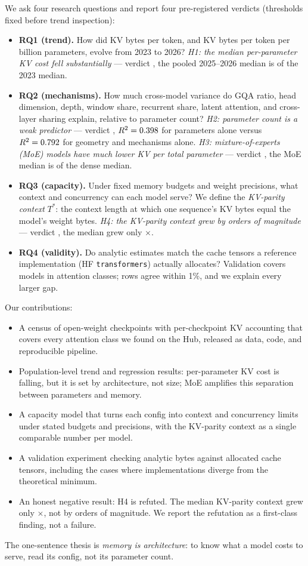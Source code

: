 We ask four research questions and report four pre-registered verdicts
(thresholds fixed before trend inspection):
\begin{itemize}
  \item \textbf{RQ1 (trend).} How did KV bytes per token, and KV bytes per token
  per billion parameters, evolve from 2023 to 2026? \emph{H1: the median
  per-parameter KV cost fell substantially} --- verdict \kvcHOneVerdict{}, the
  pooled 2025--2026 median is \kvcHOneRatio{} of the 2023 median.
  \item \textbf{RQ2 (mechanisms).} How much cross-model variance do GQA ratio,
  head dimension, depth, window share, recurrent share, latent attention, and
  cross-layer sharing explain, relative to parameter count? \emph{H2: parameter
  count is a weak predictor} --- verdict \kvcHTwoVerdict{}, $R^2=0.398$
  for parameters alone versus $R^2=0.792$ for geometry and mechanisms
  alone. \emph{H3: mixture-of-experts (MoE) models have much lower KV per total
  parameter} --- verdict \kvcHThreeVerdict{}, the MoE median is
  \kvcHThreeRatio{} of the dense median.
  \item \textbf{RQ3 (capacity).} Under fixed memory budgets and weight
  precisions, what context and concurrency can each model serve? We define the
  \emph{KV-parity context} $T^{*}$: the context length at which one sequence's
  KV bytes equal the model's weight bytes.
  \emph{H4: the KV-parity context grew by orders of magnitude} --- verdict
  \kvcHFourVerdict{}, the median grew only \kvcHFourRatio$\times$.
  \item \textbf{RQ4 (validity).} Do analytic estimates match the cache tensors
  a reference implementation (HF \texttt{transformers}) actually allocates?
  Validation covers \kvcValRows{} models in \kvcValClasses{} attention classes;
  \kvcValWithin{} rows agree within 1\%, and we explain every larger gap.
\end{itemize}

Our contributions:
\begin{itemize}
  \item A census of \kvcCensusRows{} open-weight checkpoints with per-checkpoint
  KV accounting that covers every attention class we found on the Hub, released
  as data, code, and reproducible pipeline.
  \item Population-level trend and regression results: per-parameter KV cost is
  falling, but it is set by architecture, not size; MoE amplifies this
  separation between parameters and memory.
  \item A capacity model that turns each config into context and concurrency
  limits under stated budgets and precisions, with the KV-parity context as a
  single comparable number per model.
  \item A validation experiment checking analytic bytes against allocated cache
  tensors, including the cases where implementations diverge from the
  theoretical minimum.
  \item An honest negative result: H4 is refuted. The median KV-parity context
  grew only \kvcHFourRatio$\times$, not by orders of magnitude. We report the
  refutation as a first-class finding, not a failure.
\end{itemize}

The one-sentence thesis is \emph{memory is architecture}: to know what a
model costs to serve, read its config, not its parameter count.

